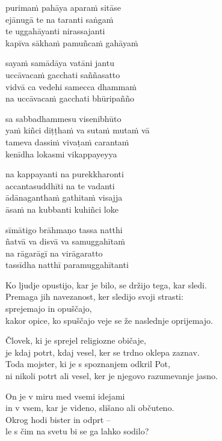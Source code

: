 
\clearpage

purimaṁ pahāya aparaṁ sitāse\\
ejānugā te na taranti saṅgaṁ\\
te uggahāyanti nirassajanti\\
kapīva sākhaṁ pamuñcaṁ gahāyaṁ

sayaṁ samādāya vatāni jantu\\
uccāvacaṁ gacchati saññasatto\\
vidvā ca vedehi samecca dhammaṁ\\
na uccāvacaṁ gacchati bhūripañño

sa sabbadhammesu visenibhūto\\
yaṁ kiñci diṭṭhaṁ va sutaṁ mutaṁ vā\\
tameva dassiṁ vivaṭaṁ carantaṁ\\
kenīdha lokasmi vikappayeyya

na kappayanti na purekkharonti\\
accantasuddhīti na te vadanti\\
ādānaganthaṁ gathitaṁ visajja\\
āsaṁ na kubbanti kuhiñci loke

sīmātigo brāhmaṇo tassa natthi\\
ñatvā va disvā va samuggahītaṁ\\
na rāgarāgī na virāgaratto\\
tassīdha natthī paramuggahītanti


\clearpage

Ko ljudje opustijo, kar je bilo, se držijo tega, kar sledi.\\
Premaga jih navezanost, ker sledijo svoji strasti:\\
sprejemajo in opuščajo,\\
kakor opice, ko spuščajo veje se že naslednje oprijemajo.

Človek, ki je sprejel religiozne običaje,\\
je kdaj potrt, kdaj vesel, ker se trdno oklepa zaznav.\\
Toda mojster, ki je s spoznanjem odkril Pot,\\
ni nikoli potrt ali vesel, ker je njegovo razumevanje jasno.

On je v miru med vsemi idejami\\
in v vsem, kar je videno, slišano ali občuteno.\\
Okrog hodi bister in odprt --\\
le s čim na svetu bi se ga lahko sodilo?

